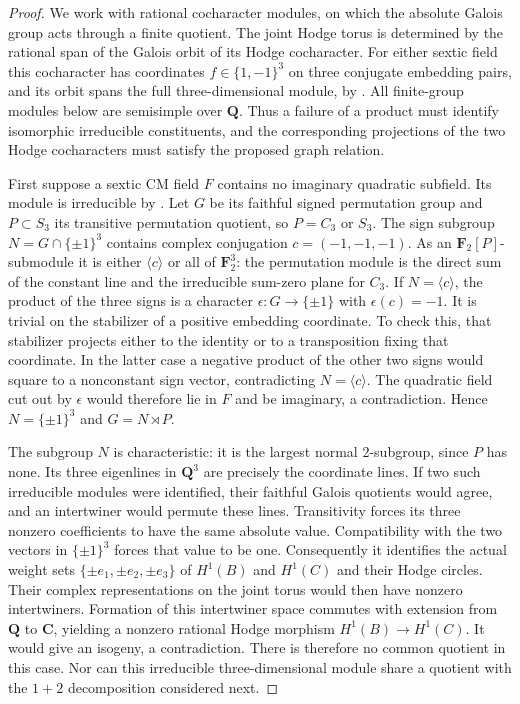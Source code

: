 \documentclass[11pt,reqno]{article}
\theoremstyle{emphasizedplain}
\theoremstyle{emphasizeddefinition}
\theoremstyle{emphasizeddefinition}
\newcommand{\Q}{\mathbf Q}
\newcommand{\C}{\mathbf C}
\begin{document}
\begin{proof}
We work with rational cocharacter modules, on which the absolute Galois
group acts through a finite quotient. The joint Hodge torus is determined
by the rational span of the Galois orbit of its Hodge cocharacter.
For either sextic field this cocharacter has coordinates
$f\in\{1,-1\}^3$ on three conjugate embedding pairs, and its orbit spans
the full three-dimensional module, by \cite[\S2.3]{MZ}.
All finite-group modules below are semisimple over $\Q$.
Thus a failure of a product must identify isomorphic irreducible
constituents, and the corresponding projections of the two Hodge
cocharacters must satisfy the proposed graph relation.

First suppose a sextic CM field $F$ contains no imaginary quadratic
subfield. Its module is irreducible by \cite[Proposition (2.4)]{MZ}.
Let $G$ be its faithful signed permutation group and $P\subset S_3$
its transitive permutation quotient, so $P=C_3$ or $S_3$.
The sign subgroup $N=G\cap\{\pm1\}^3$ contains complex conjugation
$c=(-1,-1,-1)$. As an $\mathbf F_2[P]$-submodule it is either
$\langle c\rangle$ or all of $\mathbf F_2^3$: the permutation module
is the direct sum of the constant line and the irreducible
sum-zero plane for $C_3$.
If $N=\langle c\rangle$, the product of the three signs is a
character $\epsilon:G\to\{\pm1\}$ with $\epsilon(c)=-1$.
It is trivial on the stabilizer of a positive embedding coordinate.
To check this, that stabilizer projects either to the identity or to
a transposition fixing that coordinate. In the latter case a negative
product of the other two signs would square to a nonconstant sign
vector, contradicting $N=\langle c\rangle$.
The quadratic field cut out by $\epsilon$ would therefore lie in $F$
and be imaginary, a contradiction. Hence $N=\{\pm1\}^3$ and
$G=N\rtimes P$.

The subgroup $N$ is characteristic: it is the largest normal
$2$-subgroup, since $P$ has none. Its three eigenlines in $\Q^3$ are
precisely the coordinate lines. If two such irreducible modules were
identified, their faithful Galois quotients would agree, and an
intertwiner would permute these lines. Transitivity forces its three
nonzero coefficients to have the same absolute value. Compatibility
with the two vectors in $\{\pm1\}^3$ forces that value to be one.
Consequently it identifies the actual weight sets $\{\pm e_1,\pm
 e_2,\pm e_3\}$ of $H^1(B)$ and $H^1(C)$ and their Hodge circles.
Their complex representations on the joint torus would then have
nonzero intertwiners. Formation of this intertwiner space commutes with
extension from $\Q$ to $\C$, yielding a nonzero rational Hodge morphism
$H^1(B)\to H^1(C)$. It would give an isogeny, a contradiction.
There is therefore no common quotient in this case. Nor can this
irreducible three-dimensional module share a quotient with the
$1+2$ decomposition considered next.


\end{proof}
\end{document}
